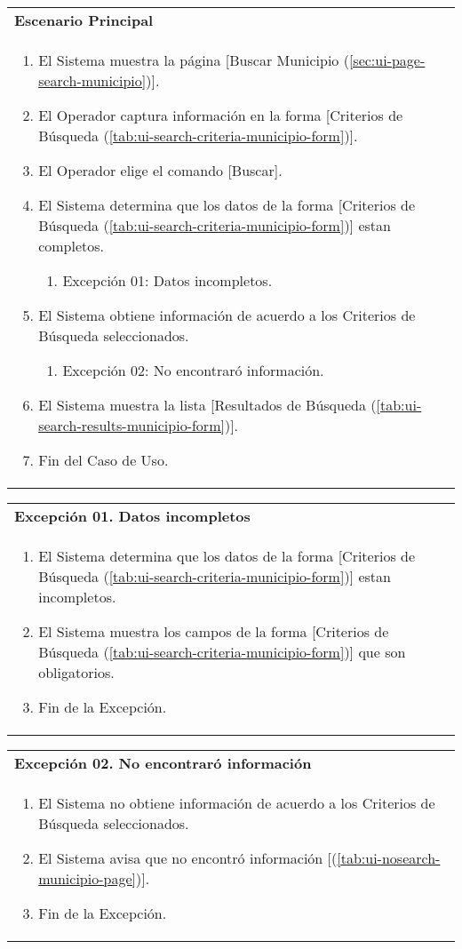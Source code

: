 \begin{tabular}{ p{15.5cm} }
	\textbf{Escenario Principal} \\
	\begin{enumerate}
		\item El Sistema muestra la página [Buscar Municipio (\ref{sec:ui-page-search-municipio})].
		\item El Operador captura información en la forma [Criterios de Búsqueda (\ref{tab:ui-search-criteria-municipio-form})].
		\item El Operador elige el comando [Buscar].
		\item El Sistema determina que los datos de la forma [Criterios de Búsqueda (\ref{tab:ui-search-criteria-municipio-form})] estan completos.
			\begin{enumerate}
				\item Excepción 01: Datos incompletos.
			\end{enumerate}
		\item El Sistema obtiene información de acuerdo a los Criterios de Búsqueda seleccionados.
			\begin{enumerate}
				\item Excepción 02: No encontraró información.
			\end{enumerate}
		\item El Sistema muestra la lista [Resultados de Búsqueda (\ref{tab:ui-search-results-municipio-form})].
		\item Fin del Caso de Uso.
	\end{enumerate}
\end{tabular}

\begin{tabular}{ p{15.5cm} }
	\textbf{Excepción 01. Datos incompletos} \\
	\begin{enumerate}
		\item El Sistema determina que los datos de la forma [Criterios de Búsqueda (\ref{tab:ui-search-criteria-municipio-form})] estan incompletos.
		\item El Sistema muestra los campos de la forma [Criterios de Búsqueda (\ref{tab:ui-search-criteria-municipio-form})] que son obligatorios.
		\item Fin de la Excepción.
	\end{enumerate}
\end{tabular}

\begin{tabular}{ p{15.5cm} }
	\textbf{Excepción 02. No encontraró información} \\
	\begin{enumerate}
		\item El Sistema no obtiene información de acuerdo a los Criterios de Búsqueda seleccionados.
		\item El Sistema avisa que no encontró información [(\ref{tab:ui-nosearch-municipio-page})].
		\item Fin de la Excepción.
	\end{enumerate}
\end{tabular}


